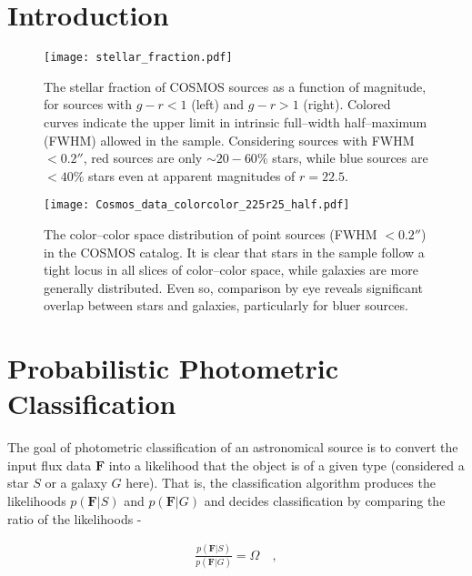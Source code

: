 \documentclass[12pt,preprint]{aastex}
\newcommand{\datavector}[1]{\boldsymbol{#1}}
\begin{document}
%
%
\section{Introduction}

\begin{figure}
\centering
\texttt{[image: stellar\_fraction.pdf]}
\caption{The stellar fraction of COSMOS sources as a function of magnitude, for sources with $g-r<1$ (left) and $g-r>1$ 
(right).  Colored curves indicate the upper limit in intrinsic full--width half--maximum (FWHM) allowed in the sample.  
Considering sources with FWHM $<0.2''$, red sources are only $\sim20-60\%$ stars, while blue sources are $<40\%$ 
stars even at apparent magnitudes of $r=22.5$.}
\label{fig:stellarfraction}
\end{figure}


\begin{figure}
\centering
\texttt{[image: Cosmos\_data\_colorcolor\_225r25\_half.pdf]}
\caption{The color--color space distribution of point sources (FWHM $< 0.2''$) in the COSMOS catalog.  
It is clear that stars in the sample follow a tight locus in all slices of color--color space, while galaxies are 
more generally distributed.  Even so, comparison by eye reveals significant overlap between stars and 
galaxies, particularly for bluer sources.}
\label{fig:color-color-data}
\end{figure}


%
%
\section{Probabilistic Photometric Classification}

The goal of photometric classification of an astronomical source is 
to convert the input flux data $\datavector{F}$ into a likelihood that 
the object is of a given type (considered a star $S$ or a galaxy $G$ 
here).  That is, the classification algorithm produces the 
likelihoods $p(\datavector{F}|S)$ and $p(\datavector{F}|G)$ and 
decides classification by comparing the ratio of the likelihoods - 

\begin{eqnarray}\displaystyle
\frac{p(\datavector{F}|S)}{p(\datavector{F}|G)} = \Omega
\quad ,
\label{eqn:oddsratio}
\end{eqnarray}
\end{document}
